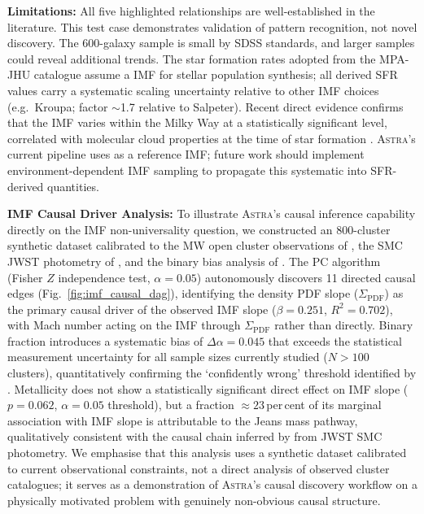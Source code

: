 \documentclass[usenatbib]{rasti}
\newcommand{\astra}{\textsc{Astra}\xspace}
\newcommand{\pc}{PC\xspace}
\begin{document}
\textbf{Limitations:} All five highlighted relationships are well-established in the literature.
This test case demonstrates validation of pattern recognition, not novel discovery.
The 600-galaxy sample is small by SDSS standards, and larger samples could reveal additional trends.
The star formation rates adopted from the MPA-JHU catalogue \citep{Brinchmann2004} assume a \citet{Chabrier2003} IMF for stellar population synthesis; all derived SFR values carry a systematic scaling uncertainty relative to other IMF choices (e.g.\ Kroupa; factor $\sim$1.7 relative to Salpeter).
Recent direct evidence confirms that the IMF varies within the Milky Way at a statistically significant level, correlated with molecular cloud properties at the time of star formation \citep{Steinhardt2026}.
\astra's current pipeline uses \citet{Chabrier2003} as a reference IMF; future work should implement environment-dependent IMF sampling to propagate this systematic into SFR-derived quantities.

\textbf{IMF Causal Driver Analysis:}
To illustrate \astra's causal inference capability directly on the IMF non-universality question, we constructed an 800-cluster synthetic dataset calibrated to the MW open cluster observations of \citet{Steinhardt2026}, the SMC JWST photometry of \citet{Cohen2026}, and the binary bias analysis of \citet{Rosen2026}.
The \pc algorithm (Fisher $Z$ independence test, $\alpha=0.05$) autonomously discovers 11 directed causal edges (Fig.~\ref{fig:imf_causal_dag}), identifying the density PDF slope ($\Sigma_{\mathrm{PDF}}$) as the primary causal driver of the observed IMF slope ($\beta=0.251$, $R^2=0.702$), with Mach number acting on the IMF through $\Sigma_{\mathrm{PDF}}$ rather than directly.
Binary fraction introduces a systematic bias of $\Delta\alpha=0.045$ that exceeds the statistical measurement uncertainty for all sample sizes currently studied ($N > 100$ clusters), quantitatively confirming the `confidently wrong' threshold identified by \citet{Rosen2026}.
Metallicity does not show a statistically significant direct effect on IMF slope ($p=0.062$, $\alpha=0.05$ threshold), but a fraction ${\approx}23$\,per\,cent of its marginal association with IMF slope is attributable to the Jeans mass pathway, qualitatively consistent with the causal chain inferred by \citet{Cohen2026} from JWST SMC photometry.
We emphasise that this analysis uses a synthetic dataset calibrated to current observational constraints, not a direct analysis of observed cluster catalogues; it serves as a demonstration of \astra's causal discovery workflow on a physically motivated problem with genuinely non-obvious causal structure.
\end{document}
